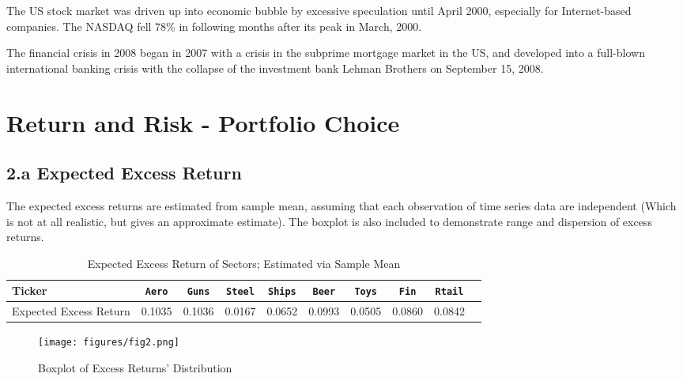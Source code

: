 \documentclass[10 pt]{hwtemplate} %
\begin{document}
The US stock market was driven up into economic bubble by excessive speculation until April 2000, especially for Internet-based companies. The NASDAQ fell 78\% in following months after its peak in March, 2000\cite{techbubble}.

The financial crisis in 2008\cite{risk} began in 2007 with a crisis in the subprime mortgage market in the US, and developed into a full-blown international banking crisis with the collapse of the investment bank Lehman Brothers on September 15, 2008.

\section{Return and Risk - Portfolio Choice}
\subsection*{2.a Expected Excess Return}
The expected excess returns are estimated from sample mean, assuming that each observation of time series data are independent (Which is not at all realistic, but gives an approximate estimate). The boxplot is also included to demonstrate range and dispersion of excess returns.

\begin{table}[htbp]
  \begin{center}
  \captionsetup{justification=centering}
  \caption{\label{tab:mean}Expected Excess Return of Sectors; Estimated via Sample Mean}
  \small
    \begin{tabular}{lccccccccc}
    \toprule
      Ticker & \texttt{Aero} & \texttt{Guns} & \texttt{Steel}& \texttt{Ships}& \texttt{Beer}& \texttt{Toys}& \texttt{Fin}&  \texttt{Rtail}\\
      \midrule
      Expected Excess Return & 0.1035  &0.1036  & 0.0167  &0.0652 & 0.0993  &0.0505&
   0.0860 & 0.0842 \\
    \bottomrule
    \end{tabular}
  \end{center}
\end{table}


\begin{figure}[H]
  \centering
  \captionsetup{justification=centering}
  \caption{\label{fig:exretbox}Boxplot of Excess Returns' Distribution}
  \vspace{-10pt}
  \texttt{[image: figures/fig2.png]}
\end{figure}
\end{document}
